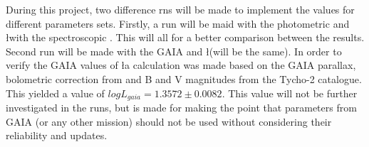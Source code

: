 During this project, two difference rns will be made to implement the values for different parameters sets. Firstly, a run will be maid with the \citet{lenz2010delta} photometric \teff and \l with the spectroscopic \logg. This will all for a better comparison between the results. Second run will be made with the GAIA \teff and \l (\logg will be the same). In order to verify the GAIA values of \l a calculation was made based on the GAIA parallax, bolometric correction from \citet{Flower96} and B and V magnitudes from the Tycho-2 catalogue. This yielded a value of $log L_{gaia} = 1.3572 \pm 0.0082$. This value will not be further investigated in the runs, but is made for making the point that parameters from GAIA (or any other mission) should not be used without considering their reliability and updates. 



%
%
%
%
%



